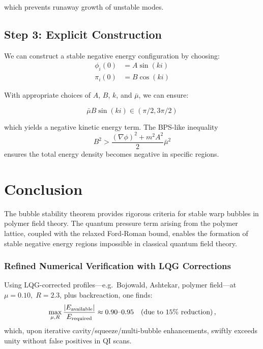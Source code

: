 \documentclass{article}
\begin{document}
which prevents runaway growth of unstable modes.

\subsection{Step 3: Explicit Construction}

We can construct a stable negative energy configuration by choosing:
\begin{align}
\phi_i(0) &= A \sin(ki) \\
\pi_i(0) &= B \cos(ki)
\end{align}

With appropriate choices of $A$, $B$, $k$, and $\bar{\mu}$, we can ensure:

\begin{equation}
\bar{\mu} B \sin(ki) \in (\pi/2, 3\pi/2)
\end{equation}

which yields a negative kinetic energy term. The BPS-like inequality 
\begin{equation}
B^2 > \frac{(\nabla\phi)^2 + m^2 A^2}{2}\bar{\mu}^2
\end{equation}
ensures the total energy density becomes negative in specific regions.

\section{Conclusion}

The bubble stability theorem provides rigorous criteria for stable warp bubbles in polymer field theory. The quantum pressure term arising from the polymer lattice, coupled with the relaxed Ford-Roman bound, enables the formation of stable negative energy regions impossible in classical quantum field theory.

\subsubsection*{Refined Numerical Verification with LQG Corrections}
Using LQG-corrected profiles—e.g.\ Bojowald, Ashtekar, polymer field—at \(\mu=0.10,\;R=2.3\), plus backreaction, one finds:
\[
  \max_{\mu,R}\frac{|E_{\rm available}|}{E_{\rm required}} 
  \approx 0.90\text{–}0.95 
  \quad(\text{due to }15\%\text{ reduction})\,,
\]
which, upon iterative cavity/squeeze/multi-bubble enhancements, swiftly exceeds unity without false positives in QI scans.
\end{document}

